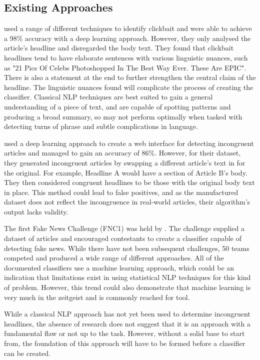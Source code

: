 \subsection{Existing Approaches} \label{existing-approaches}

 used a range of different techniques to identify clickbait and were able to achieve a 98\% accuracy with a deep learning approach. However, they only analysed the article's headline and disregarded the body text.  They found that clickbait headlines tend to have elaborate sentences with various linguistic nuances, such as "21 Pics Of Celebs Photoshopped In The Best Way Ever. These Are EPIC". There is also a statement at the end to further strengthen the central claim of the headline. The linguistic nuances found will complicate the process of creating the classifier. Classical NLP techniques are best suited to gain a general understanding of a piece of text, and are capable of spotting patterns and producing a broad summary, so may not perform optimally when tasked with detecting turns of phrase and subtle complications in language.


 used a deep learning approach to create a web interface for detecting incongruent articles and managed to gain an accuracy of 86\%. However, for their dataset, they generated incongruent articles by swapping a different article's text in for the original. For example, Headline A would have a section of Article B's body. They then considered congruent headlines to be those with the original body text in place. This method could lead to false positives, and as the manufactured dataset does not reflect the incongruence in real-world articles, their algorithm's output lacks validity.

The first Fake News Challenge (FNC1) was held by . The challenge supplied a dataset of articles and encouraged contestants to create a classifier capable of detecting fake news. While there have not been subsequent challenges, 50 teams competed and produced a wide range of different approaches. All of the documented classifiers use a machine learning approach, which could be an indication that limitations exist in using statistical NLP techniques for this kind of problem. However, this trend could also demonstrate that machine learning is very much in the zeitgeist and is commonly reached for tool.


While a classical NLP approach has not yet been used to determine incongruent headlines, the absence of research does not suggest that it is an approach with a fundamental flaw or not up to the task. However, without a solid base to start from, the foundation of this approach will have to be formed before a classifier can be created.


